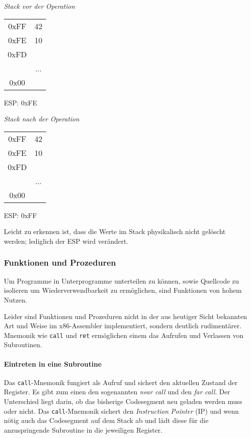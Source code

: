 \begin{multicols}{2}

\begin{minipage}{5cm}
\emph{Stack vor der Operation}
\begin{tabular}{c|c|}
    \cline{2-2}
   0xFF & 42\\ \cline{2-2}
   0xFE & 10\\ \cline{2-2}
   0xFD & \\ \cline{2-2}
          & ... \\ \cline{2-2}
     0x00 & \\ \cline{2-2}
\end{tabular}
ESP: 0xFE
\end{minipage}

\begin{minipage}{5cm}
\emph{Stack nach der Operation}
\begin{tabular}{c|c|}
    \cline{2-2}
   0xFF & 42    \\ \cline{2-2}
   0xFE & 10    \\ \cline{2-2}
   0xFD &       \\ \cline{2-2}
        & ...   \\ \cline{2-2}
   0x00 &       \\ \cline{2-2}
\end{tabular}
ESP: 0xFF
\end{minipage}
\end{multicols}

Leicht zu erkennen ist, dass die Werte im Stack physikalisch nicht gelöscht werden; lediglich der ESP wird verändert.

\subsubsection{Funktionen und Prozeduren}

Um Programme in Unterprogramme unterteilen zu können, sowie Quellcode zu isolieren um Wiederverwendbarkeit zu ermöglichen, sind Funktionen von hohem Nutzen.\cite[S. 179]{intelmanual}

Leider sind Funktionen und Prozeduren nicht in der aus heutiger Sicht bekannten Art und Weise im x86-Assembler implementiert, sondern deutlich rudimentärer.
Mnemonik wie \texttt{call} und \texttt{ret} ermöglichen einem das Aufrufen und Verlassen von Subroutinen.

\paragraph{Eintreten in eine Subroutine}
Das \texttt{call}-Mnemonik fungiert als Aufruf und sichert den aktuellen Zustand der Register.
Es gibt zum einen den sogenannten \textit{near call} und den \textit{far call}.
Der Unterschied liegt darin, ob das bisherige Codesegment neu geladen werden muss oder nicht.
Das \texttt{call}-Mnemonik sichert den \textit{Instruction Pointer} (IP) und wenn nötig auch das Codesegment auf dem Stack ab und lädt diese für die anzuspringende Subroutine in die jeweiligen Register.


